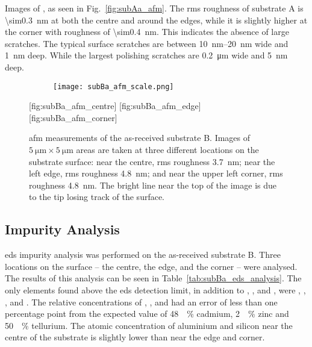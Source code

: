 Images of , as seen in Fig.~\ref{fig:subAa_afm}. The \ac{rms} roughness of substrate A is \SI{\sim0.3}{\nano\metre} at both the centre and around the edges, while it is slightly higher at the corner with  roughness of \SI{\sim0.4}{\nano\metre}. This indicates the absence of large scratches. The typical surface scratches are between \SIrange{10}{20}{\nano\metre} wide and \SI{1}{\nano\metre} deep. While the largest polishing scratches are \SI{0.2}{\micro\metre} wide and \SI{5}{\nano\metre} deep.

\begin{figure}[htbp]
    \centering
    \begin{subfigure}[b]{0.032\linewidth}
        \label{fig:subBa_afm_scale}\captionsetup{list=no}
        \texttt{[image: subBa\_afm\_scale.png]}
    \end{subfigure}
    \hfill
    [fig:subBa_afm_centre]
    \hfill
    [fig:subBa_afm_edge]
    \hfill
    [fig:subBa_afm_corner]
    \caption[\Ac{afm} of as-received substrate B.]{\Ac{afm} measurements of the as-received substrate B. Images of $\SI{5}{\micro\metre}\times\SI{5}{\micro\metre}$ areas are taken at three different locations on the substrate surface:  near the centre, \ac{rms} roughness \SI{3,7}{\nano\metre};  near the left edge, \ac{rms} roughness \SI{4,8}{\nano\metre}; and  near the upper left corner, \ac{rms} roughness \SI{4,8}{\nano\metre}. The bright line near the top of the image is due to the tip losing track of the surface.}\label{fig:subBa_afm}
\end{figure} %


\subsection{Impurity Analysis}

\Ac{eds} impurity analysis was performed on the as-received substrate B. Three locations on the surface -- the centre, the edge, and the corner -- were analysed. The results of this analysis can be seen in Table~\ref{tab:subBa_eds_analysis}. The only elements found above the \ac{eds} detection limit, in addition to , , and , were , , , and . The relative concentrations of , , and  had an error of less than one percentage point from the expected value of \SI{48}{\atomic\percent} cadmium, \SI{2}{\atomic\percent} zinc and \SI{50}{\atomic\percent} tellurium. The atomic concentration of aluminium and silicon near the centre of the substrate is slightly lower than near the edge and corner\todo{}.

